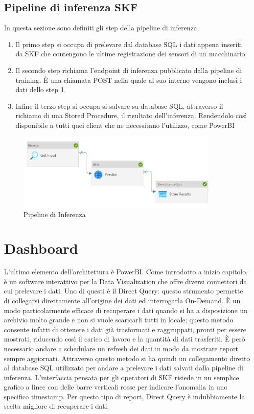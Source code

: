 \subsection{Pipeline di inferenza SKF}
In questa sezione sono definiti gli step della pipeline di inferenza.
\begin{enumerate}
	\item Il primo step si occupa di prelevare dal database SQL i dati appena inseriti da SKF che contengono le ultime registrazione dei sensori di un macchinario. 
	\item Il secondo step richiama l'endpoint di inferenza pubblicato dalla pipeline di training. È una chiamata POST nella quale al suo interno vengono inclusi i dati dello step 1.
	\item Infine il terzo step si occupa si salvare su database SQL, attraverso il richiamo di una Stored Procedure, il risultato dell'inferenza. Rendendolo così disponibile a tutti quei client che ne necessitano l'utilizzo, come PowerBI
\end{enumerate}

\begin{figure}[t]
	\centering
	\includegraphics[width=10cm, scale=1]{images/pipeline-inference}
	\caption{Pipeline di Inferenza}
	\label{pipeline-inferenza}
\end{figure}

\section{Dashboard}
L'ultimo elemento dell'architettura è PowerBI. Come introdotto a inizio capitolo, è un software interattivo per la Data Visualization che offre diversi connettori da cui prelevare i dati. Uno di questi è il Direct Query: questo strumento permette di collegarsi direttamente all'origine dei dati ed interrogarla On-Demand. È un modo particolarmente efficace di recuperare i dati quando si ha a disposizione un archivio molto grande e non si vuole scaricarli tutti in locale; questo metodo consente infatti di ottenere i dati già trasformati e raggruppati, pronti per essere mostrati, riducendo così il carico di lavoro e la quantità di dati trasferiti. È però necessario andare a schedulare un refresh dei dati in modo da mostrare report sempre aggiornati. 
Attraverso questo metodo si ha quindi un collegamento diretto al database SQL utilizzato per andare a prelevare i dati salvati dalla pipeline di inferenza.
L'interfaccia pensata per gli operatori di SKF risiede in un semplice grafico a linee con delle barre verticali rosse per indicare l'anomalia in uno specifico timestamp. Per questo tipo di report, Direct Query è indubbiamente la scelta migliore di recuperare i dati.  


